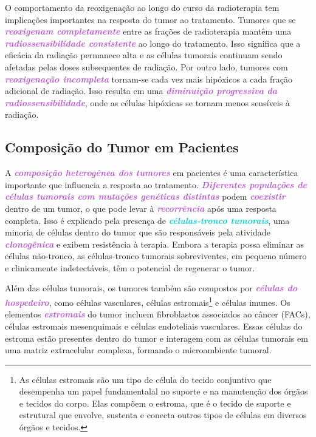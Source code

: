 \documentclass[11pt,a4paper]{article}
\begin{document}
	O comportamento da reoxigenação ao longo do curso da radioterapia tem implicações importantes na resposta do tumor ao tratamento. Tumores que se \textcolor{MediumOrchid}{\textbf{\textit{reoxigenam completamente}}} entre as frações de radioterapia mantêm uma \textcolor{MediumOrchid}{\textbf{\textit{radiossensibilidade consistente}}} ao longo do tratamento. Isso significa que a eficácia da radiação permanece alta e as células tumorais continuam sendo afetadas pelas doses subsequentes de radiação. Por outro lado, tumores com \textcolor{MediumOrchid}{\textbf{\textit{reoxigenação incompleta}}} tornam-se cada vez mais hipóxicos a cada fração adicional de radiação. Isso resulta em uma \textcolor{MediumOrchid}{\textbf{\textit{diminuição progressiva da radiossensibilidade}}}, onde as células hipóxicas se tornam menos sensíveis à radiação.

\subsection*{Composição do Tumor em Pacientes}

	A \textcolor{MediumOrchid}{\textbf{\textit{composição heterogênea dos tumores}}} em pacientes é uma característica importante que influencia a resposta ao tratamento. \textcolor{MediumOrchid}{\textbf{\textit{Diferentes populações de células tumorais com mutações genéticas distintas}}} podem \textcolor{MediumOrchid}{\textbf{\textit{coexistir}}} dentro de um tumor, o que pode levar à \textcolor{MediumOrchid}{\textbf{\textit{recorrência}}} após uma resposta completa. Isso é explicado pela presença de \textcolor{DarkTurquoise}{\textbf{\textit{células-tronco tumorais}}}, uma minoria de células dentro do tumor que são responsáveis pela atividade \textcolor{MediumOrchid}{\textbf{\textit{clonogênica}}} e exibem resistência à terapia. Embora a terapia possa eliminar as células não-tronco, as células-tronco tumorais sobreviventes, em pequeno número e clinicamente indetectáveis, têm o potencial de regenerar o tumor.

	Além das células tumorais, os tumores também são compostos por \textcolor{MediumOrchid}{\textbf{\textit{células do hospedeiro}}}, como células vasculares, células estromais\footnote{As células estromais são um tipo de célula do tecido conjuntivo que desempenha um papel fundamentalal no suporte e na manutenção dos órgãos e tecidos do corpo. Elas compõem o estroma, que é o tecido de suporte e estrutural que envolve, sustenta e conecta outros tipos de células em diversos órgãos e tecidos.} e células imunes. Os elementos \textcolor{MediumOrchid}{\textbf{\textit{estromais}}} do tumor incluem fibroblastos associados ao câncer (FACs), células estromais mesenquimais e células endoteliais vasculares. Essas células do estroma estão presentes dentro do tumor e interagem com as células tumorais em uma matriz extracelular complexa, formando o microambiente tumoral.
\end{document}
